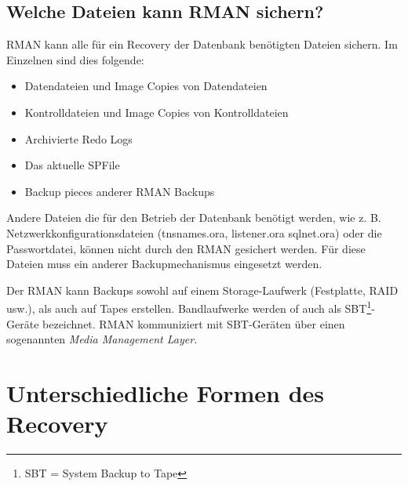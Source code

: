       \subsection{Welche Dateien kann RMAN sichern?}
        RMAN kann alle f\"ur ein Recovery der Datenbank ben\"otigten Dateien sichern. Im Einzelnen sind dies folgende:
        \begin{itemize}
          \item Datendateien und Image Copies von Datendateien
          \item Kontrolldateien und Image Copies von Kontrolldateien
          \item Archivierte Redo Logs
          \item Das aktuelle SPFile
          \item Backup pieces anderer RMAN Backups
        \end{itemize}
        Andere Dateien die f\"ur den Betrieb der Datenbank ben\"otigt werden, wie z. B. Netzwerkkonfigurationsdateien (tnsnames.ora, listener.ora sqlnet.ora) oder die Passwortdatei, k\"onnen nicht durch den RMAN gesichert werden. F\"ur diese Dateien muss ein anderer Backupmechanismus eingesetzt werden.

        Der RMAN kann Backups sowohl auf einem Storage-Laufwerk (Festplatte, RAID usw.), als auch auf Tapes erstellen. Bandlaufwerke werden of auch als SBT\footnote{SBT = System Backup to Tape}-Ger\"ate bezeichnet. RMAN kommuniziert mit SBT-Ger\"aten \"uber einen sogenannten \textit{Media Management Layer}.
    \section{Unterschiedliche Formen des Recovery}
